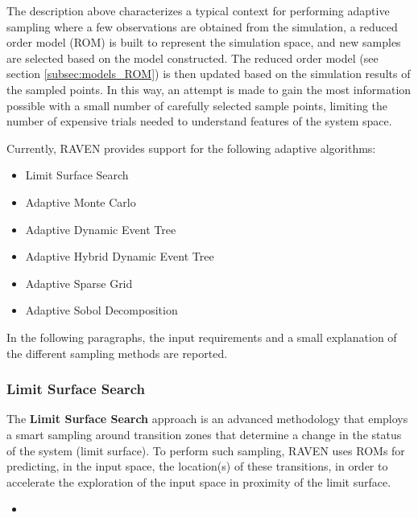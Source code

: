 The description above characterizes a typical context for performing adaptive
sampling where a few observations are obtained from the simulation, a reduced
order model (ROM) is built to represent the simulation space, and new samples
are selected based on the model constructed.
%
The reduced order model (see section \ref{subsec:models_ROM}) is then updated
based on the simulation results of the sampled points.
%
In this way, an attempt is made to gain the most information possible with a
small number of carefully selected sample points, limiting the number of
expensive trials needed to understand features of the system space.
%

Currently, RAVEN provides support for the following adaptive algorithms:

\begin{itemize}
  \item Limit Surface Search
  \item Adaptive Monte Carlo
  \item Adaptive Dynamic Event Tree
  \item Adaptive Hybrid Dynamic Event Tree
  \item Adaptive Sparse Grid
  \item Adaptive Sobol Decomposition
\end{itemize}

In the following paragraphs, the input requirements and a small explanation of
the different sampling methods are reported.

\subsubsection{Limit Surface Search}
\label{subsubsubsec:LimitSurfaceSearch}
The \textbf{Limit Surface Search} approach is an advanced methodology that employs
a smart sampling around transition zones that determine a change in the status
of the system (limit surface).
%
To perform such sampling, RAVEN uses ROMs for predicting, in the input space,
the location(s) of these transitions, in order to accelerate the exploration of
the input space in proximity of the limit surface.
%

%
\attrIntro

\begin{itemize}
  \itemsep0em
  \item \nameDescription
\end{itemize}

